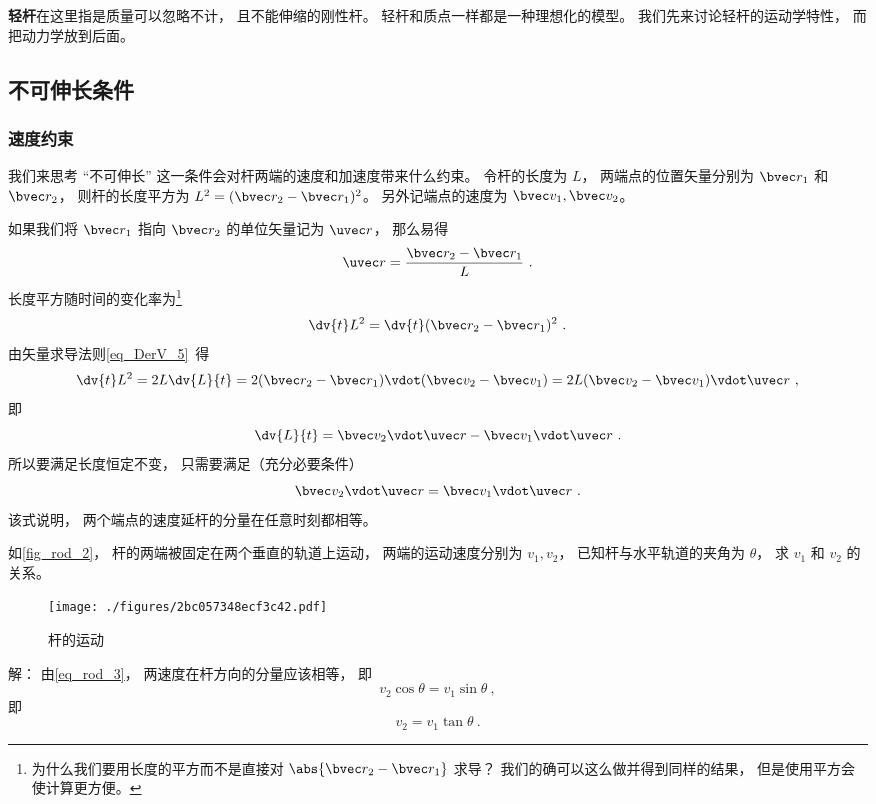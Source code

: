 

\textbf{轻杆}在这里指是质量可以忽略不计， 且不能伸缩的刚性杆。 轻杆和质点一样都是一种理想化的模型。 我们先来讨论轻杆的运动学特性， 而把动力学放到后面。

\subsection{不可伸长条件}
\subsubsection{速度约束}
我们来思考 “不可伸长” 这一条件会对杆两端的速度和加速度带来什么约束。 令杆的长度为 $L$， 两端点的位置矢量分别为 $\bvec r_1$ 和 $\bvec r_2$， 则杆的长度平方为 $L^2 = (\bvec r_2 - \bvec r_1)^2$。 另外记端点的速度为 $\bvec v_1, \bvec v_2$。

如果我们将 $\bvec r_1$ 指向 $\bvec r_2$ 的单位矢量记为 $\uvec r$， 那么易得
\begin{equation}\label{eq_rod_7}
\uvec r = \frac{\bvec r_2 - \bvec r_1}{L}~.
\end{equation}
长度平方随时间的变化率为\footnote{为什么我们要用长度的平方而不是直接对 $\abs{\bvec r_2 - \bvec r_1}$ 求导？ 我们的确可以这么做并得到同样的结果， 但是使用平方会使计算更方便。}
\begin{equation}\label{eq_rod_2}
\dv{t} L^2 = \dv{t} (\bvec r_2 - \bvec r_1)^2~.
\end{equation}
由矢量求导法则\autoref{eq_DerV_5}~得
\begin{equation}\label{eq_rod_1}
\dv{t} L^2 = 2L \dv{L}{t} = 2 (\bvec r_2 - \bvec r_1) \vdot (\bvec v_2 - \bvec v_1) = 2L (\bvec v_2 - \bvec v_1) \vdot \uvec r~,
\end{equation}
即
\begin{equation}\label{eq_rod_6}
\dv{L}{t} = \bvec v_2 \vdot \uvec r - \bvec v_1 \vdot \uvec r~.
\end{equation}
所以要满足长度恒定不变， 只需要满足（充分必要条件）
\begin{equation}\label{eq_rod_3}
\bvec v_2 \vdot \uvec r = \bvec v_1 \vdot \uvec r~.
\end{equation}
该式说明， 两个端点的速度延杆的分量在任意时刻都相等。

\begin{example}{}\label{ex_rod_1}
如\autoref{fig_rod_2}， 杆的两端被固定在两个垂直的轨道上运动， 两端的运动速度分别为 $v_1, v_2$， 已知杆与水平轨道的夹角为 $\theta$， 求 $v_1$ 和 $v_2$ 的关系。
\begin{figure}[ht]
\centering
\texttt{[image: ./figures/2bc057348ecf3c42.pdf]}
\caption{杆的运动} \label{fig_rod_1}
\end{figure}
解： 由\autoref{eq_rod_3}， 两速度在杆方向的分量应该相等， 即
\begin{equation}
v_2 \cos\theta = v_1 \sin\theta~,
\end{equation}
即
\begin{equation}
v_2 = v_1 \tan\theta~.
\end{equation}
\end{example}

